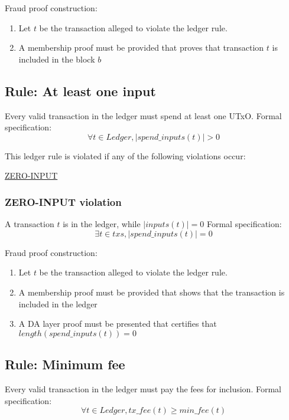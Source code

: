 \documentclass[../midgard.tex]{subfiles}
\begin{document}
Fraud proof construction:
\begin{enumerate}
  \item Let $t$ be the transaction alleged to violate the ledger rule. 
  \item A membership proof must be provided that proves that transaction $t$ is included in the block $b$
\end{enumerate}

\subsection{Rule: At least one input}
\label{rule:at-least-one-input}
Every valid transaction in the ledger must spend at least one UTxO.
Formal specification:
\begin{equation*}
    \forall t \in Ledger, |spend\_inputs(t)| > 0
\end{equation*}

This ledger rule is violated if any of the following violations occur:
\begin{itemize-multi}
  \item \hyperref[violation:ZERO-INPUT]{ZERO-INPUT}
\end{itemize-multi}

\subsubsection{ZERO-INPUT violation}
\label{violation:ZERO-INPUT}
A transaction $t$ is in the ledger, while $|inputs(t)| = 0$
Formal specification:
\begin{equation*}
    \exists t \in txs, |spend\_inputs(t)| = 0
\end{equation*}

Fraud proof construction:
\begin{enumerate}
  \item Let $t$ be the transaction alleged to violate the ledger rule. 
  \item A membership proof must be provided that shows that the transaction is included in the ledger
  \item A DA layer proof must be presented that certifies that $length(spend\_inputs(t)) = 0$
\end{enumerate}

\subsection{Rule: Minimum fee}
\label{rule:minimum-fee}
Every valid transaction in the ledger must pay the fees for inclusion.
Formal specification:
\begin{equation*}
    \forall t \in Ledger, tx\_fee(t) \geq min\_fee(t)
\end{equation*}
\end{document}
